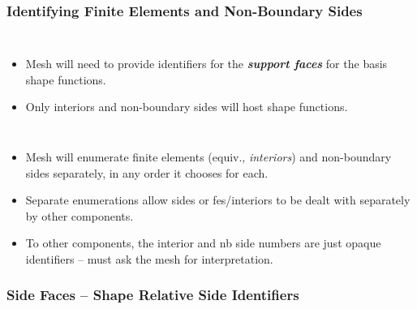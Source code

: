 \documentclass{beamer}
\begin{document}
\begin{frame}
  \frametitle{Identifying Finite Elements and Non-Boundary Sides}
  \begin{columns}
      \begin{itemize}[<+->]
        \item Mesh will need to provide identifiers for the \emph{\textbf{support faces}} for the basis shape functions.
        \item Only interiors and non-boundary sides will host shape functions.
      \end{itemize}
       {}
               {}
  \end{columns}
  \begin{itemize}[<+->]
    \item Mesh will enumerate finite elements (equiv., \emph{interiors}) and non-boundary sides separately, in any order it chooses for each.
    \item Separate enumerations allow sides or fes/interiors to be dealt with separately by other components.
    \item To other components, the interior and nb side numbers are just opaque identifiers -- must ask the mesh for interpretation.
  \end{itemize}
\end{frame}
 
\subsubsection{Side Faces -- Shape Relative Side Identifiers}
\end{document}
